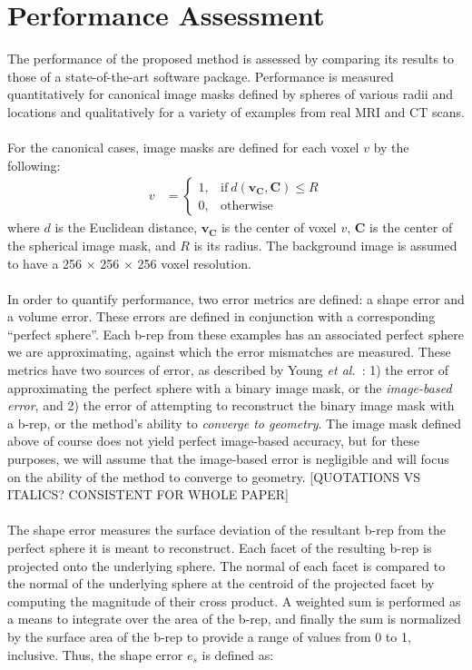 \section{Performance Assessment}
%

The performance of the proposed method is assessed by comparing its results to those of a state-of-the-art software package. Performance is measured quantitatively for canonical image masks defined by spheres of various radii and locations and qualitatively for a variety of examples from real MRI and CT scans. \\ \\
%
For the canonical cases, image masks are defined for each voxel ${v}$ by the following:
\begin{align} 
	v &=  \begin{cases}
		1, & \text{if}\ d \left(\bm{v_C},\bm{C}\right) \le R \\
		0, & \text{otherwise}
	\end{cases}
\end{align}
where $d$ is the Euclidean distance, $\bm{v_C}$ is the center of voxel $v$, $\bm{C}$ is the center of the spherical image mask, and $R$ is its radius. The background image is assumed to have a 256 $\times$ 256 $\times$ 256 voxel resolution. \\ \\
%
In order to quantify performance, two error metrics are defined: a shape error and a volume error. These errors are defined in conjunction with a corresponding ``perfect sphere''. Each b-rep from these examples has an associated perfect sphere we are approximating, against which the error mismatches are measured. These metrics have two sources of error, as described by Young \textit{et al.}~\cite{young_2008}: 1) the error of approximating the perfect sphere with a binary image mask, or the \textit{image-based error}, and 2) the error of attempting to reconstruct the binary image mask with a b-rep, or the method's ability to \textit{converge to geometry}. The image mask defined above of course does not yield perfect image-based accuracy, but for these purposes, we will assume that the image-based error is negligible and will focus on the ability of the method to converge to geometry. [QUOTATIONS VS ITALICS? CONSISTENT FOR WHOLE PAPER]\\ \\
%
The shape error measures the surface deviation of the resultant b-rep from the perfect sphere it is meant to reconstruct. Each facet of the resulting b-rep is projected onto the underlying sphere. The normal of each facet is compared to the normal of the underlying sphere at the centroid of the projected facet by computing the magnitude of their cross product. A weighted sum is performed as a means to integrate over the area of the b-rep, and finally the sum is normalized by the surface area of the b-rep to provide a range of values from 0 to 1, inclusive. Thus, the shape error $e_s$ is defined as:
